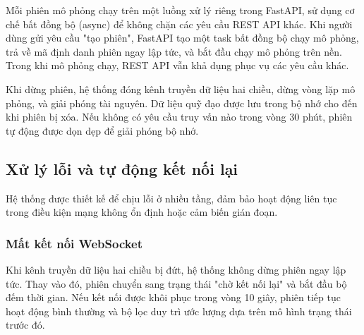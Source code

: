 \begin{table}[H]
\centering
\caption{Các endpoint REST API}
\label{tab:rest-api}
\end{table}

Mỗi phiên mô phỏng chạy trên một luồng xử lý riêng trong FastAPI, sử dụng cơ chế bất đồng bộ (async) để không chặn các yêu cầu REST API khác. Khi người dùng gửi yêu cầu "tạo phiên", FastAPI tạo một task bất đồng bộ chạy mô phỏng, trả về mã định danh phiên ngay lập tức, và bắt đầu chạy mô phỏng trên nền. Trong khi mô phỏng chạy, REST API vẫn khả dụng phục vụ các yêu cầu khác.

Khi dừng phiên, hệ thống đóng kênh truyền dữ liệu hai chiều, dừng vòng lặp mô phỏng, và giải phóng tài nguyên. Dữ liệu quỹ đạo được lưu trong bộ nhớ cho đến khi phiên bị xóa. Nếu không có yêu cầu truy vấn nào trong vòng 30 phút, phiên tự động được dọn dẹp để giải phóng bộ nhớ.

\subsection{Xử lý lỗi và tự động kết nối lại}

\hspace{0.5cm} Hệ thống được thiết kế để chịu lỗi ở nhiều tầng, đảm bảo hoạt động liên tục trong điều kiện mạng không ổn định hoặc cảm biến gián đoạn.

\subsubsection{Mất kết nối WebSocket}

\hspace{0.5cm} Khi kênh truyền dữ liệu hai chiều bị đứt, hệ thống không dừng phiên ngay lập tức. Thay vào đó, phiên chuyển sang trạng thái "chờ kết nối lại" và bắt đầu bộ đếm thời gian. Nếu kết nối được khôi phục trong vòng 10 giây, phiên tiếp tục hoạt động bình thường và bộ lọc duy trì ước lượng dựa trên mô hình trạng thái trước đó.

